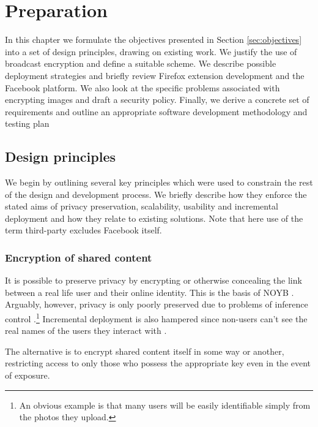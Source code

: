 \chapter{Preparation}\label{ch:preparation}

In this chapter we formulate the objectives presented in Section \ref{sec:objectives} into a set of design principles, drawing on existing work. We justify the use of broadcast encryption and define a suitable scheme. We describe possible deployment strategies and briefly review Firefox extension development and the Facebook platform. We also look at the specific problems associated with encrypting images and draft a security policy. Finally, we derive a concrete set of requirements and outline an appropriate software development methodology and testing plan


\FloatBarrier
\section{Design principles}
\label{sec:principles}

We begin by outlining several key principles which were used to constrain the rest of the design and development process. We briefly describe how they enforce the stated aims of privacy preservation, scalability, usability and incremental deployment and how they relate to existing solutions. Note that here use of the term third-party excludes Facebook itself.


\FloatBarrier
\subsection{Encryption of shared content}

It is possible to preserve privacy by encrypting or otherwise concealing the link between a real life user and their online identity. This is the basis of NOYB \cite{noyb}. Arguably, however, privacy is only poorly preserved due to problems of inference control \cite{ross}.\footnote{An obvious example is that many users will be easily identifiable simply from the photos they upload.} Incremental deployment is also hampered since non-users can't see the real names of the users they interact with \cite{facecloak}.

The alternative is to encrypt shared content itself in some way or another, restricting access to only those who possess the appropriate key even in the event of exposure.


